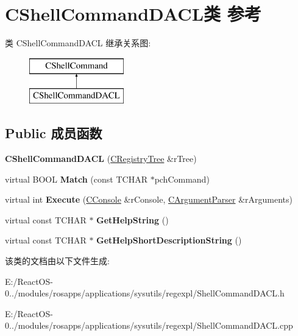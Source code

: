 \hypertarget{class_c_shell_command_d_a_c_l}{}\section{C\+Shell\+Command\+D\+A\+C\+L类 参考}
\label{class_c_shell_command_d_a_c_l}
类 C\+Shell\+Command\+D\+A\+CL 继承关系图\+:\begin{figure}[H]
\begin{center}
\leavevmode
\includegraphics[height=2.000000cm]{class_c_shell_command_d_a_c_l}
\end{center}
\end{figure}
\subsection*{Public 成员函数}
\begin{DoxyCompactItemize}
\item 
\mbox{\label{class_c_shell_command_d_a_c_l_a02d6d4226b0b57e13e9fcbb6af7af0a9}} 
{\bfseries C\+Shell\+Command\+D\+A\+CL} (\hyperlink{class_c_registry_tree}{C\+Registry\+Tree} \&r\+Tree)
\item 
\mbox{\label{class_c_shell_command_d_a_c_l_a7d39ac5ae71d60bca996f13421e23644}} 
virtual B\+O\+OL {\bfseries Match} (const T\+C\+H\+AR $\ast$pch\+Command)
\item 
\mbox{\label{class_c_shell_command_d_a_c_l_aa095c73499e674ea7b334e84b905dc65}} 
virtual int {\bfseries Execute} (\hyperlink{class_c_console}{C\+Console} \&r\+Console, \hyperlink{class_c_argument_parser}{C\+Argument\+Parser} \&r\+Arguments)
\item 
\mbox{\label{class_c_shell_command_d_a_c_l_ada5e068513eec2ee3ccc52946b64acae}} 
virtual const T\+C\+H\+AR $\ast$ {\bfseries Get\+Help\+String} ()
\item 
\mbox{\label{class_c_shell_command_d_a_c_l_ae47db8914ff339f60057f92b7018bd67}} 
virtual const T\+C\+H\+AR $\ast$ {\bfseries Get\+Help\+Short\+Description\+String} ()
\end{DoxyCompactItemize}


该类的文档由以下文件生成\+:\begin{DoxyCompactItemize}
\item 
E\+:/\+React\+O\+S-\/0../modules/rosapps/applications/sysutils/regexpl/Shell\+Command\+D\+A\+C\+L.\+h\item 
E\+:/\+React\+O\+S-\/0../modules/rosapps/applications/sysutils/regexpl/Shell\+Command\+D\+A\+C\+L.\+cpp\end{DoxyCompactItemize}
